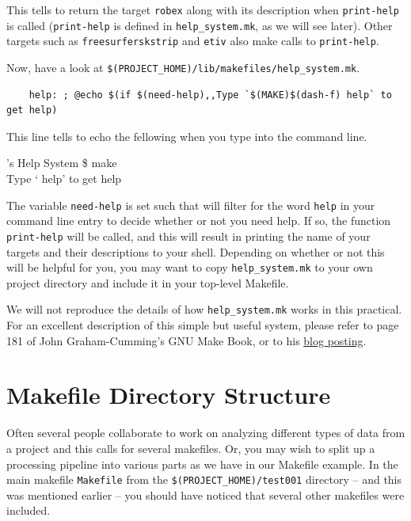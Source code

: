 This tells \maken{} to return the target \texttt{robex} along with its description when \texttt{print-help} is called (\texttt{print-help} is defined in \texttt{help_system.mk}, as we will see later). Other targets such as \texttt{freesurferskstrip} and \texttt{etiv} also make calls to \texttt{print-help}.

Now, have a look at \texttt{\$(PROJECT_HOME)/lib/makefiles/help_system.mk}.
\begin{lstlisting}
	help: ; @echo $(if $(need-help),,Type `$(MAKE)$(dash-f) help` to get help)
\end{lstlisting}

This line tells \maken{} to echo the fellowing when you type \maken{} into the command line.
\begin{bash}{\maken{}'s Help System}{}
\$ make \\
Type `\maken{} help' to get help
\end{bash}

The variable \texttt{need-help} is set such that \maken{} will filter for the word \texttt{help} in your command line entry to decide whether or not you need help. If so, the function \texttt{print-help} will be called, and this will result in \maken{} printing the name of your targets and their descriptions to your shell. Depending on whether or not this will be helpful for you, you may want to copy \texttt{help_system.mk} to your own project directory and include it in your top-level Makefile. 

We will not reproduce the details of how \texttt{help\_system.mk} works in this practical. For an excellent description of this simple but useful system, please refer to page 181 of John Graham-Cumming's GNU Make Book, or to his \href{http://www.cmcrossroads.com/article/self-documenting-makefiles}{blog posting}.  

\section{Makefile Directory Structure}
Often several people collaborate to work on analyzing different types of data from a project and this calls for several makefiles. Or, you may wish to split up a processing pipeline into various parts as we have in our Makefile example. In the main makefile \texttt{Makefile} from the \texttt{\$(PROJECT\_HOME)/test001} directory -- and this was mentioned earlier -- you should have noticed that several other makefiles were included. 


